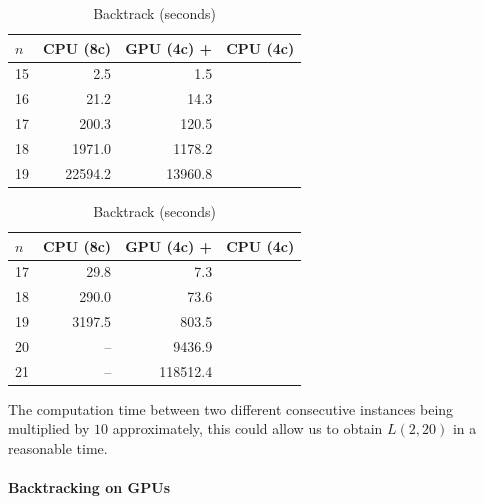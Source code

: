 \begin{table}[htb]
\begin{minipage}[b]{0.5\linewidth}

\centering
\begin{tabular}{l r r r}
					\hline
					$n$ & CPU (8c) &  GPU (4c) +  &  \hspace*{-.8em}CPU (4c) \\
					\hline
					\hline
					15	& 2.5 & 1.5 & \\
					16  & 21.2 &14.3 & \\
					17  & 200.3 &120.5 &\\
					18  & 1971.0 &1178.2 &\\
					19  & 22594.2 & 13960.8 & \\ 
					\hline
\end{tabular}
					
\caption{Regularized method (seconds)}

\label{tab:result_base_regu}

\end{minipage}
\begin{minipage}[b]{0.5\linewidth}

\centering
\begin{tabular}{ l r r r }
					\hline
					$n$ & CPU (8c) &  GPU (4c) +  &  \hspace*{-.8em}CPU (4c) \\
					\hline
					\hline
					17  & 29.8 & 7.3&\\
					18  & 290.0 & 73.6&\\
					19  & 3197.5 & 803.5& \\
					20  & -- & 9436.9 &\\
					21  & -- & 118512.4& \\ 
					\hline
\end{tabular}
					
\caption{Backtrack  (seconds)}
\label{tab:result_backtrack}

\end{minipage}
\end{table}

The computation time between two different consecutive instances being multiplied by $10$ approximately, this could allow us to obtain $L(2,20)$ in a reasonable time.


\paragraph{Backtracking on GPUs}

